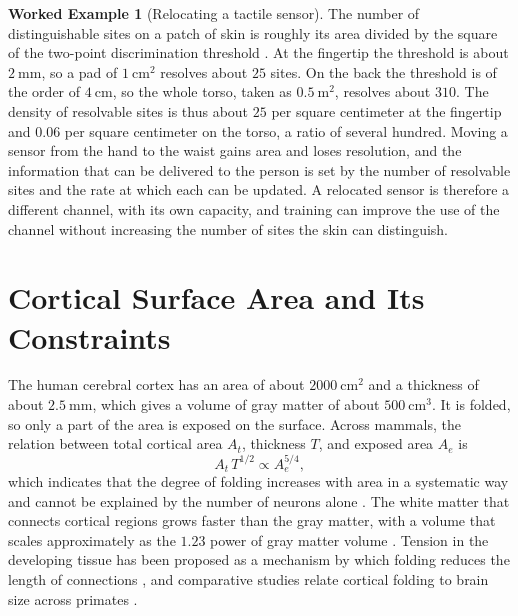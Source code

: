 \documentclass[11pt,openany]{book}
\theoremstyle{definition}
\newtheorem{example}{Worked Example}[chapter]
\theoremstyle{remark}
\begin{document}
\begin{example}[Relocating a tactile sensor]
\label{ex:tactile}
The number of distinguishable sites on a patch of skin is roughly its area divided by the square of the two-point discrimination threshold \cite{weinstein1968}. At the fingertip the threshold is about $2\ \mathrm{mm}$, so a pad of $1\ \mathrm{cm^{2}}$ resolves about $25$ sites. On the back the threshold is of the order of $4\ \mathrm{cm}$, so the whole torso, taken as $0.5\ \mathrm{m^{2}}$, resolves about $310$. The density of resolvable sites is thus about $25$ per square centimeter at the fingertip and $0.06$ per square centimeter on the torso, a ratio of several hundred. Moving a sensor from the hand to the waist gains area and loses resolution, and the information that can be delivered to the person is set by the number of resolvable sites and the rate at which each can be updated. A relocated sensor is therefore a different channel, with its own capacity, and training can improve the use of the channel without increasing the number of sites the skin can distinguish.
\end{example}

\section{Cortical Surface Area and Its Constraints}

The human cerebral cortex has an area of about $2000\ \mathrm{cm^{2}}$ and a thickness of about $2.5\ \mathrm{mm}$, which gives a volume of gray matter of about $500\ \mathrm{cm^{3}}$. It is folded, so only a part of the area is exposed on the surface. Across mammals, the relation between total cortical area $A_t$, thickness $T$, and exposed area $A_e$ is
\begin{equation}
A_t\,T^{1/2}\propto A_e^{5/4},
\label{eq:fold}
\end{equation}
which indicates that the degree of folding increases with area in a systematic way and cannot be explained by the number of neurons alone \cite{mota2015}. The white matter that connects cortical regions grows faster than the gray matter, with a volume that scales approximately as the $1.23$ power of gray matter volume \cite{zhang2000}. Tension in the developing tissue has been proposed as a mechanism by which folding reduces the length of connections \cite{vanessen1997}, and comparative studies relate cortical folding to brain size across primates \cite{zilles2013,hofman2014}.
\end{document}
